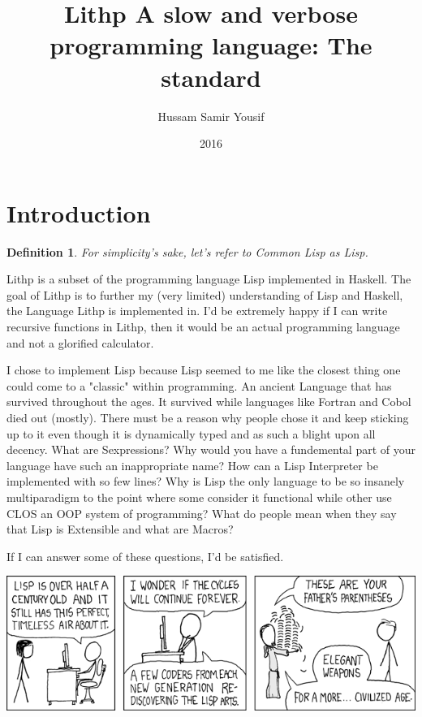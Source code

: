 \documentclass[14pt,a4paper]{article}
\newtheorem{mydef}{Definition}
\begin{document}
\title{Lithp A slow and verbose programming language: The standard}
\author{Hussam Samir Yousif}
\date{2016}
\maketitle

\section{Introduction}

\begin{mydef}
    For simplicity's sake, let's refer to Common Lisp as Lisp.
\end{mydef}

Lithp is a subset of the programming language Lisp implemented in Haskell. The goal of Lithp is to further
my (very limited) understanding of Lisp and Haskell, the Language Lithp is implemented in. I'd be extremely happy if I
can write recursive functions in Lithp, then it would be an actual programming language and not a glorified calculator.

I chose to implement Lisp because Lisp seemed to me like the closest thing one could come to a "classic" within
programming. An ancient Language that has survived throughout the ages. It survived while languages like Fortran
and Cobol died out (mostly). There must be a reason why people chose it and keep sticking up to it even though
it is dynamically typed and as such a blight upon all decency. What are Sexpressions? Why would you have a fundemental
part of your language have such an inappropriate name? How can a Lisp Interpreter be implemented with so few lines?
Why is Lisp the only language to be so insanely multiparadigm to the point where some consider it functional while
other use CLOS an OOP system of programming? What do people mean when they say that Lisp is Extensible and what
are Macros?

If I can answer some of these questions, I'd be satisfied.


\vspace{1cm}
\includegraphics[scale=0.6]{paran.png}
\vspace{1cm}
\end{document}
